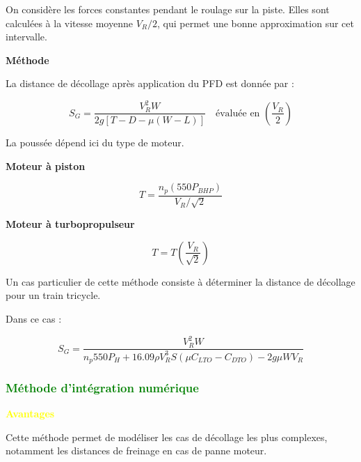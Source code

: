 		On considère les forces constantes pendant le roulage sur la piste. Elles sont calculées à la vitesse moyenne $V_R/2$, qui permet une bonne approximation sur cet intervalle.
		
		\vspace{0.3cm}
		
		\textbf{Méthode}
		
		La distance de décollage après application du PFD est donnée par :
		
		\begin{equation*}
			S_G= \frac{ V_R^2 W	}{ 2g[T-D-\mu(W-L)]	}
			\quad
			\text{évaluée en }
			\left(\frac{V_R}{2}\right)
		\end{equation*}
		
		La poussée dépend ici du type de moteur.
		
		\vspace{0.3cm}
		
		\textbf{Moteur à piston}
		
		\[ T= 	\frac{n_p(550P_{BHP})	}{	V_R/\sqrt{2}	}	\]
		
		\vspace{0.3cm}
		
		\textbf{Moteur à turbopropulseur}
		
		\[	T=T\left(\frac{V_R}{\sqrt{2}}\right)	\]
		
		\vspace{0.3cm}
		
		Un cas particulier de cette méthode consiste à déterminer la distance de décollage pour un train tricycle.
		
		Dans ce cas :
		
		\begin{equation*}
			S_G=	\frac{	V_R^2 W	}{	n_p 550 P_H		+	16.09\rho V_R^3 S 	(\mu C_{LTO}-C_{DTO})	-	2g\mu W V_R		}
		\end{equation*}
		
		\subsubsection{ \textcolor{green} { Méthode d’intégration numérique}}
		
		\textbf{\textcolor{yellow}{Avantages}}
		
		Cette méthode permet de modéliser les cas de décollage les plus complexes, notamment les distances de freinage en cas de panne moteur.
		
